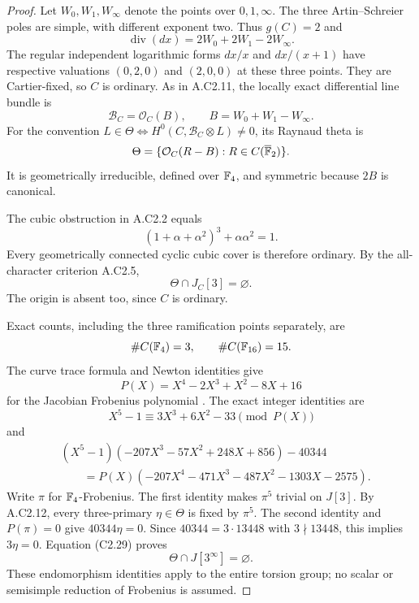 \begin{proof}
Let $W_0,W_1,W_\infty$ denote the points over $0,1,\infty$.
The three Artin--Schreier poles are simple, with different exponent
two. Thus $g(C)=2$ and
\[
 \operatorname{div}(dx)=2W_0+2W_1-2W_\infty.
\]
The regular independent logarithmic forms $dx/x$ and $dx/(x+1)$
have respective valuations $(0,2,0)$ and $(2,0,0)$ at these
three points. They are Cartier-fixed, so $C$ is ordinary.
As in A.C2.11, the locally exact differential line bundle is
\[
 \mathcal B_C=\mathcal O_C(B),\qquad B=W_0+W_1-W_\infty.
\]
For the convention
$L\in\Theta\Longleftrightarrow H^0(C,\mathcal B_C\otimes L)\ne0$,
its Raynaud theta is
\[
 \Theta=\{\mathcal O_C(R-B):R\in C(\overline{\mathbb F}_2)\}.
\]
It is geometrically irreducible, defined over $\mathbb F_4$, and
symmetric because $2B$ is canonical.

The cubic obstruction in A.C2.2 equals
\[
                   (1+\alpha+\alpha^2)^3+\alpha\alpha^2=1.
\]
Every geometrically connected cyclic cubic cover is therefore
ordinary. By the all-character criterion A.C2.5,
\[
                         \Theta\cap J_C[3]=\varnothing.          \tag{C2.29}
\]
The origin is absent too, since $C$ is ordinary.

Exact counts, including the three ramification points separately, are
\[
                \#C(\mathbb F_4)=3,\qquad \#C(\mathbb F_{16})=15.
\]
The curve trace formula and Newton identities give
\[
                       P(X)=X^4-2X^3+X^2-8X+16                 \tag{C2.30}
\]
for the Jacobian Frobenius polynomial
\citep[III, Theorem 11.1 and Corollary 11.4; II, Theorem 1.1]
{A_Milne2008}. The exact integer identities are
\[
             X^5-1\equiv3X^3+6X^2-33\pmod{P(X)}
\]
and
\[
 \begin{aligned}
 &(X^5-1)(-207X^3-57X^2+248X+856)-40344\\
 &\qquad=P(X)(-207X^4-471X^3-487X^2-1303X-2575).
 \end{aligned}                                                   \tag{C2.31}
\]
Write $\pi$ for $\mathbb F_4$-Frobenius. The first identity makes
$\pi^5$ trivial on $J[3]$. By A.C2.12, every three-primary
$\eta\in\Theta$ is fixed by $\pi^5$. The second identity and
$P(\pi)=0$ give $40344\eta=0$. Since
$40344=3\cdot13448$ with $3\nmid13448$, this implies $3\eta=0$.
Equation (C2.29) proves
\[
                      \Theta\cap J[3^\infty]=\varnothing.        \tag{C2.32}
\]
These endomorphism identities apply to the entire torsion group;
no scalar or semisimple reduction of Frobenius is assumed.


\end{proof}
